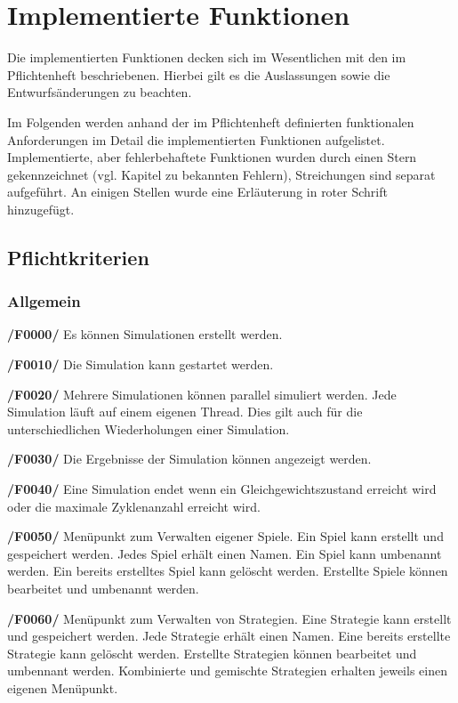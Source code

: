\section{Implementierte Funktionen}

Die implementierten Funktionen decken sich im Wesentlichen mit den im Pflichtenheft beschriebenen. Hierbei gilt es die Auslassungen sowie die Entwurfsänderungen zu beachten.

Im Folgenden werden anhand der im Pflichtenheft definierten funktionalen Anforderungen im Detail die implementierten Funktionen aufgelistet. Implementierte, aber fehlerbehaftete Funktionen wurden durch einen Stern gekennzeichnet (vgl. Kapitel zu bekannten Fehlern), Streichungen sind separat aufgeführt. An einigen Stellen wurde eine Erläuterung in roter Schrift hinzugefügt.

\subsection{Pflichtkriterien}

\subsubsection{Allgemein}

\textbf{/F0000/}
Es können Simulationen erstellt werden.

\textbf{/F0010/} 
Die Simulation kann gestartet werden.

\textbf{/F0020/}
Mehrere Simulationen können parallel simuliert werden. Jede Simulation läuft auf einem eigenen Thread. {\color{red} Dies gilt auch für die unterschiedlichen Wiederholungen einer Simulation.}

\textbf{/F0030/} 
Die Ergebnisse der Simulation können angezeigt werden.

\textbf{/F0040/}
Eine Simulation endet wenn ein Gleichgewichtszustand erreicht wird oder
die maximale Zyklenanzahl erreicht wird.

\textbf{/F0050/}
Menüpunkt zum Verwalten eigener Spiele. Ein Spiel kann erstellt und gespeichert werden. Jedes Spiel erhält einen Namen. Ein Spiel kann umbenannt werden. Ein bereits erstelltes Spiel kann gelöscht werden. Erstellte Spiele können bearbeitet und umbenannt werden.

\textbf{/F0060/}
Menüpunkt zum Verwalten von Strategien. Eine Strategie kann erstellt und gespeichert werden. Jede Strategie erhält einen Namen. Eine bereits erstellte Strategie kann gelöscht werden. Erstellte Strategien können bearbeitet und umbennant werden. {\color{red} Kombinierte und gemischte Strategien erhalten jeweils einen eigenen Menüpunkt.}

